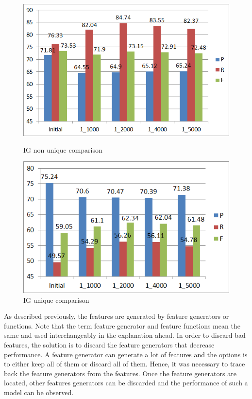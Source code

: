 \begin{figure}
\centering
\begin{minipage}{.5\textwidth}
  \centering
  \includegraphics[width=.95\textwidth]{figures/IGFirst5k_NU.png}
  \caption{IG non unique comparison}
  \label{fig:IG_5k_NU}
\end{minipage}%
\begin{minipage}{.5\textwidth}
  \centering
  \includegraphics[width=.95\textwidth]{figures/IGFirst5k_U.png}
  \caption{IG unique comparison}
  \label{fig:IG_5k_U}
\end{minipage}
\end{figure} 


As described previously, the features are generated by feature generators or functions. Note that the term feature generator and feature functions mean the same and used interchangeably in the explanation ahead. In order to discard bad features, the solution is to discard the feature generators that decrease performance. A feature generator can generate a lot of features and the options is to either keep all of them or discard all of them. Hence, it was necessary to trace back the feature generators from the features. Once the feature generators are located, other features generators can be discarded and the performance of such a model can be observed.

